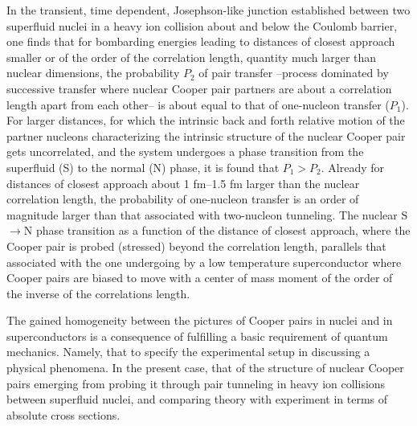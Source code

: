 In the transient, time dependent, Josephson-like junction established between two superfluid nuclei     in a heavy ion collision about and below the Coulomb barrier, one finds that for bombarding energies leading to distances of closest approach smaller or of the order of the correlation length, quantity much larger than nuclear dimensions, the probability $P_2$ of pair transfer --process dominated by successive transfer where nuclear Cooper pair partners are about a correlation length apart from each other-- is about equal to that of one-nucleon transfer ($P_1$). For larger distances, for which the intrinsic back and forth relative motion of the partner nucleons characterizing the intrinsic structure of the nuclear Cooper pair gets uncorrelated, and the system undergoes a phase transition from the superfluid (S) to the normal (N) phase, it is found that $P_1>P_2$. Already for distances of closest approach about 1 fm--1.5 fm larger than the nuclear correlation length, the probability of one-nucleon transfer is an order of magnitude larger than that associated with two-nucleon tunneling. The nuclear S$\to$N phase transition as a function of the distance of closest approach, where the Cooper pair is probed (stressed) beyond the correlation length, parallels that associated with the one undergoing by a low temperature superconductor where Cooper pairs are biased to move with a center of mass moment of the order of the inverse of the correlations length.

 The gained homogeneity  between the pictures of Cooper pairs in nuclei and in superconductors is a consequence of fulfilling a basic requirement of quantum mechanics. Namely, that to specify the experimental setup in discussing a physical phenomena. In the present case, that of the structure of nuclear Cooper pairs emerging from probing it through pair tunneling in heavy ion collisions between superfluid nuclei, and comparing theory with experiment in terms of absolute cross sections. 




















